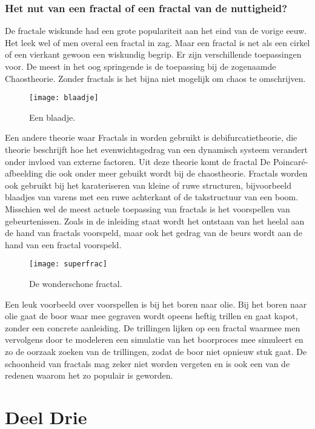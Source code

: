 \documentclass[11pt,fleqn]{book} %
\begin{document}
\section{Het nut van een fractal of een fractal van de nuttigheid?}
De fractale wiskunde had een grote populariteit aan het eind van de vorige eeuw. Het leek wel of men overal een fractal in zag. Maar een fractal is net als een cirkel of een vierkant gewoon een wiskundig begrip. Er zijn verschillende toepassingen voor. De meest in het oog springende is de toepassing bij de zogenaamde Chaostheorie. Zonder fractals is het bijna niet mogelijk om chaos te omschrijven.
\begin{figure}[h]
	\centering\texttt{[image: blaadje]}
	\caption{Een blaadje.}
	\label{fig:blaadje}
\end{figure}
Een andere theorie waar Fractals in worden gebruikt is debifurcatietheorie, die theorie beschrijft hoe het evenwichtsgedrag van een dynamisch systeem verandert onder invloed van externe factoren. Uit deze theorie komt de fractal De Poincaré-afbeelding die ook onder meer gebuikt wordt bij de chaostheorie. 
Fractals worden ook gebruikt bij het karateriseren van kleine of ruwe structuren, bijvoorbeeld blaadjes van varens met een ruwe achterkant of de takstructuur van een boom. Misschien wel de meest actuele toepassing van fractals is het voorspellen van gebeurtenissen. Zoals in de inleiding staat wordt het ontstaan van het heelal aan de hand van fractals voorspeld, maar ook het gedrag van de beurs wordt aan de hand van een fractal voorspeld.
\begin{figure}[h]
	\centering\texttt{[image: superfrac]}
	\caption{De wonderschone fractal.}
	\label{fig:superfrac}
\end{figure} 
Een leuk voorbeeld over voorspellen is bij het boren naar olie. Bij het boren naar olie gaat de boor waar mee gegraven wordt opeens heftig trillen en gaat kapot, zonder een concrete aanleiding. De trillingen lijken op een fractal waarmee men vervolgens door te modeleren een simulatie van het boorproces mee simuleert en zo de oorzaak zoeken van de trillingen, zodat de boor niet opnieuw stuk gaat.
De schoonheid van fractals mag zeker niet worden vergeten en is ook een van de redenen waarom het zo populair is geworden.


\part{Deel Drie}
\end{document}
